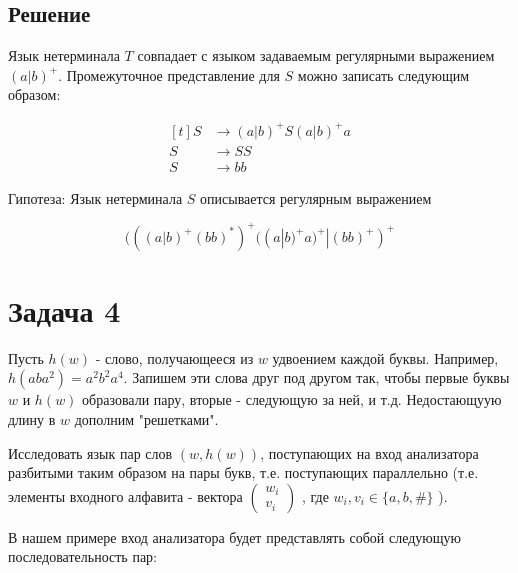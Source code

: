 \documentclass[a4paper, 14pt]{article}
\begin{document}
\subsection{Решение}

Язык нетерминала $T$ совпадает с языком задаваемым регулярными выражением $(a|b)^{+}$.
Промежуточное представление для $S$ можно записать следующим образом:

\begin{equation*}
	\begin{aligned}[t]
		S &\rightarrow (a|b)^{+}S(a|b)^{+}a\\  
		S &\rightarrow SS\\
		S &\rightarrow bb
	\end{aligned}
\end{equation*}


Гипотеза: Язык нетерминала $S$ описывается регулярным выражением

$$(((a|b)^{+}(bb)^{*})^{+}((a|b)^{+}a)^{+} | (bb)^{+})^{+}$$

\newpage 

\section{Задача 4}

Пусть $h(w)$ - слово, получающееся из $w$ удвоением каждой буквы. Например, $h(aba^2) = a^{2}b^{2}a^{4}$. Запишем эти слова друг под другом так, чтобы первые буквы $w$ и $h(w)$ образовали пару, вторые - следующую за ней, и т.д. Недостающуую длину в $w$ дополним "решетками".

Исследовать язык пар слов $(w, h(w))$, поступающих на вход анализатора разбитыми таким образом на пары букв, т.е. поступающих параллельно (т.е. элементы входного алфавита - вектора
$
\begin{pmatrix}
	w_i\\
	v_i
\end{pmatrix}
$ 
, где $w_i, v_i \in \{a, b, \# \}$
). 

В нашем примере вход анализатора будет представлять собой следующую последовательность пар:
\end{document}
